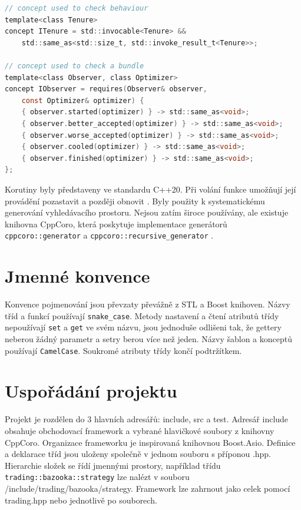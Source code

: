 \begin{lstlisting}[caption={~Specifikace rozhraní pomocí konceptů},label={lst:concepts:example},captionpos=t,abovecaptionskip=-\medskipamount,belowcaptionskip=\medskipamount,language=C]
// concept used to check behaviour
template<class Tenure>
concept ITenure = std::invocable<Tenure> &&
    std::same_as<std::size_t, std::invoke_result_t<Tenure>>;

// concept used to check a bundle
template<class Observer, class Optimizer>
concept IObserver = requires(Observer& observer,
    const Optimizer& optimizer) {
    { observer.started(optimizer) } -> std::same_as<void>;
    { observer.better_accepted(optimizer) } -> std::same_as<void>;
    { observer.worse_accepted(optimizer) } -> std::same_as<void>;
    { observer.cooled(optimizer) } -> std::same_as<void>;
    { observer.finished(optimizer) } -> std::same_as<void>;
};
\end{lstlisting}

Korutiny byly představeny ve standardu C++20.
Při volání funkce umožňují její provádění pozastavit a později obnovit \cite{coroutines}.
Byly použity k systematickému generování vyhledávacího prostoru.
Nejsou zatím široce používány, ale existuje knihovna CppCoro, která poskytuje implementace generátorů \texttt{cppcoro::generator} a \texttt{cppcoro::recursive\_generator} \cite{cppcoro}.



\section{Jmenné konvence}
Konvence pojmenování jsou převzaty převážně z STL a Boost knihoven.
Názvy tříd a funkcí používají \texttt{snake\_case}.
Metody nastavení a čtení atributů třídy nepoužívají \texttt{set} a \texttt{get} ve svém názvu, jsou jednoduše odlišeni tak, že gettery neberou žádný parametr a setry berou více než jeden.
Názvy šablon a konceptů používají \texttt{CamelCase}.
Soukromé atributy třídy končí podtržítkem.

\section{Uspořádání projektu}
Projekt je rozdělen do 3 hlavních adresářů: include, src a test.
Adresář include obsahuje obchodovací framework a vybrané hlavičkové soubory z knihovny CppCoro.
Organizace frameworku je inspirovaná knihovnou Boost.Asio.
Definice a deklarace tříd jsou uloženy společně v jednom souboru s příponou .hpp.
Hierarchie složek se řídí jmennými prostory, například třídu \texttt{trading::bazooka::strategy} lze nalézt v souboru /include/trading/bazooka/strategy.
Framework lze zahrnout jako celek pomocí trading.hpp nebo jednotlivě po souborech.

